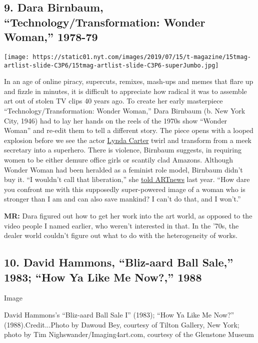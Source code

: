 \hypertarget{9-dara-birnbaum-technologytransformation-wonder-woman-1978-79}{%
\subsection{9. Dara Birnbaum, ``Technology/Transformation: Wonder
Woman,''
1978-79}\label{9-dara-birnbaum-technologytransformation-wonder-woman-1978-79}}

\texttt{[image: https://static01.nyt.com/images/2019/07/15/t-magazine/15tmag-artlist-slide-C3P6/15tmag-artlist-slide-C3P6-superJumbo.jpg]}

In an age of online piracy, supercuts, remixes, mash-ups and memes that
flare up and fizzle in minutes, it is difficult to appreciate how
radical it was to assemble art out of stolen TV clips 40 years ago. To
create her early masterpiece ``Technology/Transformation: Wonder
Woman,'' Dara Birnbaum (b. New York City, 1946) had to lay her hands on
the reels of the 1970s show ``Wonder Woman'' and re-edit them to tell a
different story. The piece opens with a looped explosion before we see
the actor
\href{https://www.nytimes.com/2018/03/31/style/where-is-lynda-carter-now-wonder-woman.html}{Lynda
Carter} twirl and transform from a meek secretary into a superhero.
There is violence, Birnbaum suggests, in requiring women to be either
demure office girls or scantily clad Amazons. Although Wonder Woman had
been heralded as a feminist role model, Birnbaum didn't buy it. ``I
wouldn't call that liberation,'' she
\href{http://www.artnews.com/2018/03/27/icons-dara-birnbaum/}{told
ARTnews} last year. ``How dare you confront me with this supposedly
super-powered image of a woman who is stronger than I am and can also
save mankind? I can't do that, and I won't.''

\textbf{MR:} Dara figured out how to get her work into the art world, as
opposed to the video people I named earlier, who weren't interested in
that. In the '70s, the dealer world couldn't figure out what to do with
the heterogeneity of works.

\hypertarget{10-david-hammons-bliz-aard-ball-sale-1983-how-ya-like-me-now-1988}{%
\subsection{10. David Hammons, ``Bliz-aard Ball Sale,'' 1983; ``How Ya
Like Me Now?,''
1988}\label{10-david-hammons-bliz-aard-ball-sale-1983-how-ya-like-me-now-1988}}

Image

David Hammons's ``Bliz-aard Ball Sale I'' (1983); ``How Ya Like Me
Now?'' (1988).Credit...Photo by Dawoud Bey, courtesy of Tilton Gallery,
New York; photo by Tim Nighswander/Imaging4art.com, courtesy of the
Glenstone Museum

